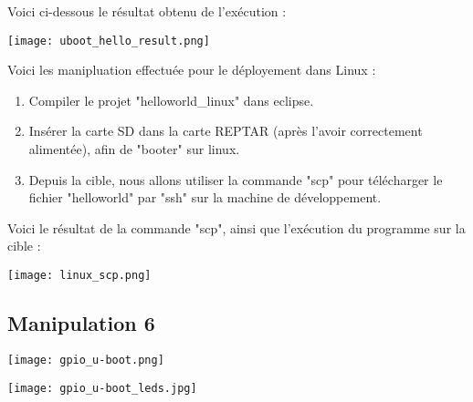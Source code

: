Voici ci-dessous le résultat obtenu de l'exécution : 

\begin{center} 
\hspace{12.45cm}
\texttt{[image: uboot\_hello\_result.png]}
\end{center}
\vspace{1cm} 

\pagebreak

Voici les manipluation effectuée pour le déployement dans Linux :
\begin{enumerate}
\item Compiler le projet "helloworld\_linux" dans eclipse.
\item Insérer la carte SD dans la carte REPTAR (après l'avoir correctement alimentée), afin de "booter" sur linux.
\item Depuis la cible, nous allons utiliser la commande "scp" pour télécharger le fichier "helloworld" par "ssh" sur la machine de développement.
\end{enumerate}

Voici le résultat de la commande "scp", ainsi que l'exécution du programme sur la cible : 

\begin{center} 
\hspace{12.45cm}
\texttt{[image: linux\_scp.png]}
\end{center}
\vspace{1cm} 

\pagebreak
\subsection{Manipulation 6}
\begin{center} 
\hspace{12.45cm}
\texttt{[image: gpio\_u-boot.png]}
\end{center}
\vspace{1cm} 

\begin{center} 
\hspace{12.45cm}
\texttt{[image: gpio\_u-boot\_leds.jpg]}
\end{center}
\vspace{1cm} 
